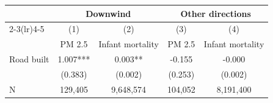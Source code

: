 {
\def\sym#1{\ifmmode^{#1}\else\(^{#1}\)\fi}
\begin{tabular}{l*{4}{c}}
\hline\hline
                         &\multicolumn{2}{c}{Downwind}   &\multicolumn{2}{c}{Other directions}\\\cmidrule(lr){2-3}\cmidrule(lr){4-5}
                         &\multicolumn{1}{c}{(1)}&\multicolumn{1}{c}{(2)}&\multicolumn{1}{c}{(3)}&\multicolumn{1}{c}{(4)}\\
                         &\multicolumn{1}{c}{PM 2.5}&\multicolumn{1}{c}{Infant mortality}&\multicolumn{1}{c}{PM 2.5}&\multicolumn{1}{c}{Infant mortality}\\
\hline
Road built               &       1.007***&       0.003** &      -0.155   &      -0.000   \\
                         &     (0.383)   &     (0.002)   &     (0.253)   &     (0.002)   \\
\hline
N                        &     129,405   &   9,648,574   &     104,052   &   8,191,400   \\
\hline\hline
\end{tabular}
}
